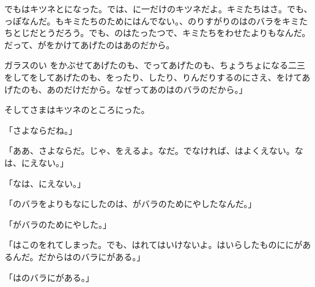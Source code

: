 でもはキツネとになった。では、に一だけのキツネだよ。キミたちはさ。でも、っぽなんだ。もキミたちのためにはんでない。、のりすがりのはのバラをキミたちとじだとうだろう。でも、のはたったつで、キミたちをわせたよりもなんだ。だって、がをかけてあげたのはあのだから。

ガラスのい をかぶせてあげたのも、でってあげたのも、ちょうちょになる二三をしてをしてあげたのも、をったり、したり、りんだりするのにさえ、をけてあげたのも、あのだけだから。なぜってあのはのバラのだから。」

そしてさまはキツネのところにった。

「さよならだね。」

「ああ、さよならだ。じゃ、をえるよ。なだ。でなければ、はよくえない。なは、にえない。」

「なは、にえない。」

「のバラをよりもなにしたのは、がバラのためにやしたなんだ。」

「がバラのためにやした。」

「はこのをれてしまった。でも、はれてはいけないよ。はいらしたものににがあるんだ。だからはのバラにがある。」

「はのバラにがある。」


